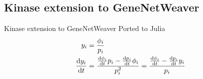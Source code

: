 \subsection{Kinase extension to GeneNetWeaver}
\begin{frame}{Kinase extension to GeneNetWeaver}
\label{sec:gnw_extension}
Ported to Julia
\begin{subequations}
\label{eq:gnw_kinase}
\begin{align}
\label{eq:y_i}
y_i &= \frac{\phi_i}{p_i}
\\
\label{eq:dydt}
\dv{y_i}{t} &= \frac{\dv{\phi_i}{t} p_i - \dv{p_i}{t} \phi_i}{p_i^2} = \frac{\dv{\phi_i}{t} - \dv{p_i}{t} y_i}{p_i}
\end{align}
\end{subequations}

\end{frame}
